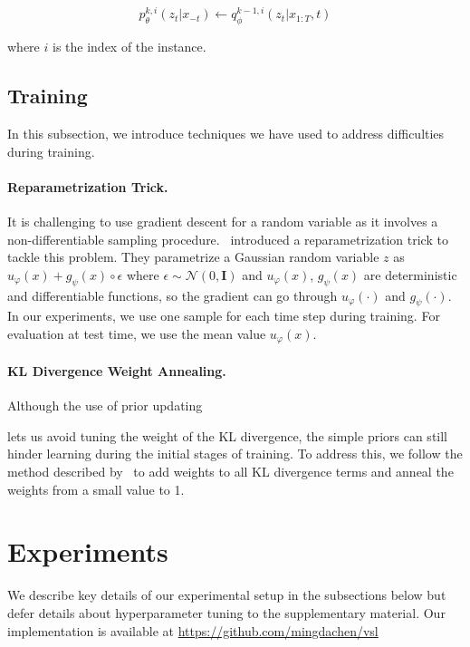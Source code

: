 \documentclass[11pt,a4paper]{article}
\newcommand{\qtcomments}[1]{\textcolor{gray}{\bf \small [ #1 --QT]}}
\renewcommand{\qtcomments}[1]{}
\begin{document}
\begin{equation}
   p^{k,i}_\theta(z_t\vert x_{-t})\leftarrow q^{k-1,i}_\phi(z_t\vert x_{1:T}, t)\label{eqn:sim-prior}
\end{equation}

\noindent where $i$ is the index of the instance.

\subsection{Training}
In this subsection, we introduce techniques we have used to address difficulties during training.

\paragraph{Reparametrization Trick.}
It is challenging to use gradient descent for a random variable as it involves a non-differentiable sampling procedure.~\citet{kingma2013auto} introduced a reparametrization trick to tackle this problem.
They parametrize a Gaussian random variable $z$ as $u_\varphi(x) + g_\psi(x)\circ\epsilon$ where
$\epsilon\sim\mathcal{N}(0,\mathbf{I})$
\qtcomments{$\mathcal{N}(0,\mathbf{I})$ seems more precise.} and $u_\varphi(x)$, $g_\psi(x)$ are deterministic and differentiable functions,
so the gradient can go through
$u_\varphi(\cdot)$ and $g_\psi(\cdot)$.
In our experiments, we use one sample for each time step during training.  For evaluation at test time, we use the mean value $u_\varphi(x)$.

\paragraph{KL Divergence Weight Annealing.} Although the use of prior updating

lets us avoid tuning the weight of the KL divergence, the simple priors can still hinder learning during the initial stages of training. To address this, we follow the method described by~\citet{bowman2016generating} to add weights to all KL divergence terms and anneal the weights from a small value to 1.

\section{Experiments}

We describe key details of our experimental setup in the subsections below but defer details about hyperparameter tuning to the supplementary material. Our implementation is available at \url{https://github.com/mingdachen/vsl}
\end{document}
